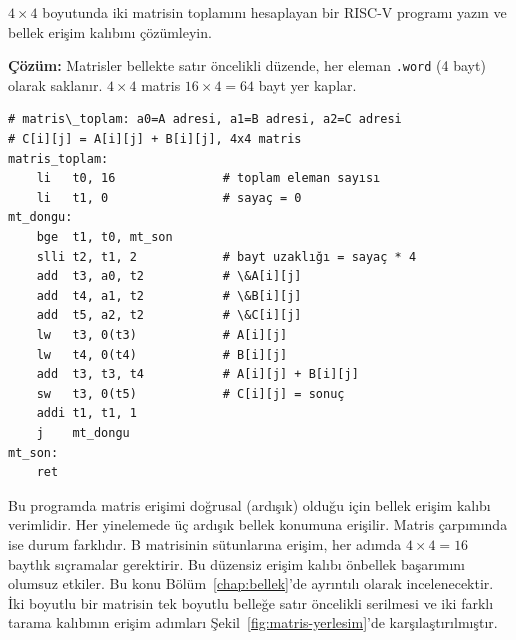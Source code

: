 \begin{ornek}[4.22]
\label{orn:matris-toplam}
$4 \times 4$ boyutunda iki matrisin toplamını hesaplayan bir RISC-V programı yazın ve bellek erişim kalıbını çözümleyin.

\textbf{Çözüm:} Matrisler bellekte satır öncelikli düzende, her eleman \texttt{.word} (4 bayt) olarak saklanır. $4 \times 4$ matris $16 \times 4 = 64$ bayt yer kaplar.

\begin{lstlisting}[style=riscv]
# matris\_toplam: a0=A adresi, a1=B adresi, a2=C adresi
# C[i][j] = A[i][j] + B[i][j], 4x4 matris
matris_toplam:
    li   t0, 16               # toplam eleman sayısı
    li   t1, 0                # sayaç = 0
mt_dongu:
    bge  t1, t0, mt_son
    slli t2, t1, 2            # bayt uzaklığı = sayaç * 4
    add  t3, a0, t2           # \&A[i][j]
    add  t4, a1, t2           # \&B[i][j]
    add  t5, a2, t2           # \&C[i][j]
    lw   t3, 0(t3)            # A[i][j]
    lw   t4, 0(t4)            # B[i][j]
    add  t3, t3, t4           # A[i][j] + B[i][j]
    sw   t3, 0(t5)            # C[i][j] = sonuç
    addi t1, t1, 1
    j    mt_dongu
mt_son:
    ret
\end{lstlisting}

Bu programda matris erişimi doğrusal (ardışık) olduğu için bellek erişim kalıbı verimlidir. Her yinelemede üç ardışık bellek konumuna erişilir. Matris çarpımında ise durum farklıdır. B matrisinin sütunlarına erişim, her adımda $4 \times 4 = 16$ baytlık sıçramalar gerektirir. Bu düzensiz erişim kalıbı önbellek başarımını olumsuz etkiler. Bu konu Bölüm~\ref{chap:bellek}'de ayrıntılı olarak incelenecektir. İki boyutlu bir matrisin tek boyutlu belleğe satır öncelikli serilmesi ve iki farklı tarama kalıbının erişim adımları Şekil~\ref{fig:matris-yerlesim}'de karşılaştırılmıştır.
\end{ornek}

